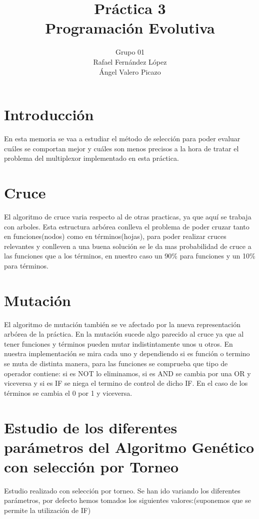 \documentclass[12pt]{article}
\title{Práctica 3\\Programación Evolutiva}
\author{Grupo 01\\Rafael Fernández López\\Ángel Valero Picazo}
\date{}
\begin{document}
\maketitle
\newpage
\newpage
\tableofcontents
\newpage

\section{Introducción}

	En esta memoria se vaa a estudiar el método de selección para poder
    evaluar cuáles se comportan mejor y cuáles son menos precisos a la hora de tratar el problema del
    multiplexor implementado en esta práctica.


\section{Cruce}

	El algoritmo de cruce varia respecto al de otras practicas, ya que aquí se trabaja con arboles. Esta estructura arbórea conlleva el problema de poder cruzar tanto en funciones(nodos) como en términos(hojas), para poder realizar cruces relevantes y conlleven a una buena solución se le da mas probabilidad de cruce a las funciones que a los términos, en nuestro caso un 90\% para funciones y un 10\% para términos. 

\section{Mutación}

	El algoritmo de mutación también se ve afectado por la nueva representación arbórea de la práctica. En la mutación sucede algo parecido al cruce ya que al tener funciones y términos pueden mutar indistintamente unos u otros. En nuestra implementación se mira cada uno y dependiendo si es función o termino se muta de distinta manera, para las funciones se comprueba que tipo de operador contiene: si es NOT lo eliminamos, si es AND se cambia por una OR y viceversa y si es IF se niega el termino de control de dicho IF. En el caso de los términos se cambia el 0 por 1 y viceversa.

\section{Estudio de los diferentes parámetros del Algoritmo Genético con selección por Torneo}

	Estudio realizado con selección por torneo. Se han ido variando los diferentes parámetros, por defecto hemos tomados los siguientes valores:(suponemos que se permite la utilización de IF)
\end{document}
